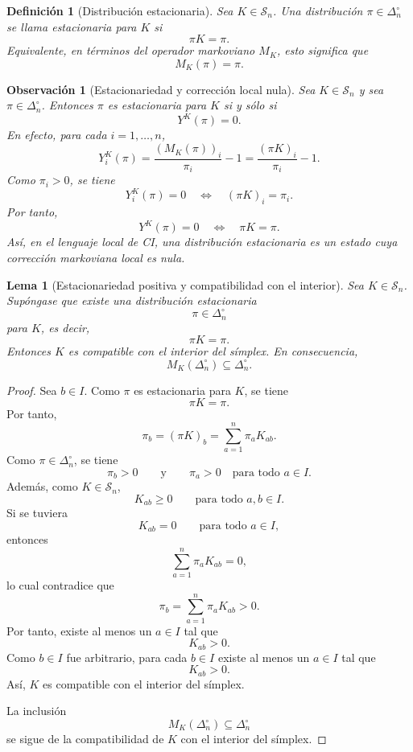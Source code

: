 \documentclass[12pt]{article}
\newtheorem{definicion}{Definición}[section]
\newtheorem{lema}{Lema}[section]
\newtheorem{observacion}{Observación}[section]
\begin{document}


\begin{definicion}[Distribución estacionaria]\label{def:estacionaria_markov}
Sea \(K\in\mathcal S_n\). Una distribución \(\pi\in\Delta_n^\circ\) se llama estacionaria para \(K\) si
\[
\pi K=\pi.
\]
Equivalente, en términos del operador markoviano \(M_K\), esto significa que
\[
M_K(\pi)=\pi.
\]
\end{definicion}


\begin{observacion}[Estacionariedad y corrección local nula]\label{obs:estacionaria_correccion_nula}
Sea \(K\in\mathcal S_n\) y sea \(\pi\in\Delta_n^\circ\). Entonces \(\pi\) es estacionaria para \(K\) si y sólo si
\[
Y^K(\pi)=0.
\]
En efecto, para cada \(i=1,\dots,n\),
\[
Y_i^K(\pi)
=
\frac{(M_K(\pi))_i}{\pi_i}-1
=
\frac{(\pi K)_i}{\pi_i}-1.
\]
Como \(\pi_i>0\), se tiene
\[
Y_i^K(\pi)=0
\quad\Longleftrightarrow\quad
(\pi K)_i=\pi_i.
\]
Por tanto,
\[
Y^K(\pi)=0
\quad\Longleftrightarrow\quad
\pi K=\pi.
\]
Así, en el lenguaje local de CI, una distribución estacionaria es un estado cuya corrección markoviana local es nula.
\end{observacion}



\begin{lema}[Estacionariedad positiva y compatibilidad con el interior]\label{lem:estacionaria_implica_interior}
Sea \(K\in\mathcal S_n\). Supóngase que existe una distribución estacionaria
\[
\pi\in\Delta_n^\circ
\]
para \(K\), es decir,
\[
\pi K=\pi.
\]
Entonces \(K\) es compatible con el interior del símplex. En consecuencia,
\[
M_K(\Delta_n^\circ)\subseteq \Delta_n^\circ.
\]
\end{lema}

\begin{proof}
Sea \(b\in I\). Como \(\pi\) es estacionaria para \(K\), se tiene
\[
\pi K=\pi.
\]
Por tanto,
\[
\pi_b=(\pi K)_b=\sum_{a=1}^n \pi_aK_{ab}.
\]
Como \(\pi\in\Delta_n^\circ\), se tiene
\[
\pi_b>0
\qquad\text{y}\qquad
\pi_a>0
\quad\text{para todo }a\in I.
\]
Además, como \(K\in\mathcal S_n\),
\[
K_{ab}\ge 0
\qquad\text{para todo }a,b\in I.
\]
Si se tuviera
\[
K_{ab}=0
\qquad\text{para todo }a\in I,
\]
entonces
\[
\sum_{a=1}^n \pi_aK_{ab}=0,
\]
lo cual contradice que
\[
\pi_b=\sum_{a=1}^n \pi_aK_{ab}>0.
\]
Por tanto, existe al menos un \(a\in I\) tal que
\[
K_{ab}>0.
\]
Como \(b\in I\) fue arbitrario, para cada \(b\in I\) existe al menos un \(a\in I\) tal que
\[
K_{ab}>0.
\]
Así, \(K\) es compatible con el interior del símplex.

La inclusión
\[
M_K(\Delta_n^\circ)\subseteq \Delta_n^\circ
\]
se sigue de la compatibilidad de \(K\) con el interior del símplex.
\end{proof}
\end{document}
